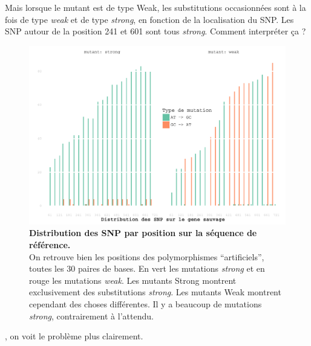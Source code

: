 \documentclass[a4paper]{tufte-handout}
\begin{document}
Mais lorsque le mutant est de type Weak, les substitutions occasionnées sont à la
fois de type \emph{weak} et de type \emph{strong}, en fonction de la localisation du SNP.
Les SNP autour de la position 241 et 601 sont tous \emph{strong}. Comment interpréter
ça ?

\begin{figure}[h]
  \centering
  \includegraphics[width=\linewidth]{../substitution_distribution.pdf}
  \caption{\textbf{Distribution des SNP par position sur la séquence de référence.} \\
  On retrouve bien les positions des polymorphismes ``artificiels'', toutes les
  $30$ paires de bases. En vert les mutations \emph{strong} et en rouge les
  mutations \emph{weak}. Les mutants Strong montrent exclusivement des
  substitutions \emph{strong}. Les mutants Weak montrent cependant des
  choses différentes. Il y a beaucoup de mutations \emph{strong}, contrairement
  à l'attendu. 
  }
  \label{figure2}
\end{figure}

, on voit le problème plus clairement.  
\end{document}
